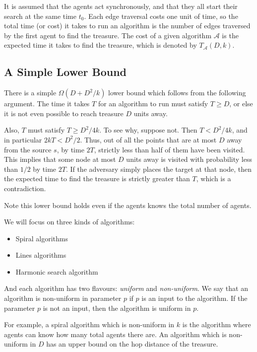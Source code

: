\documentclass[runningheads,a4paper]{llncs}
\begin{document}
It is assumed that the agents act synchronously, and that they all start their search at the same time $t_0$. Each edge traversal costs one unit of time, so the total time (or cost) it takes to run an algorithm is the number of edges traversed by the first agent to find the treasure. The cost of a given algorithm $\mathcal{A}$ is the expected time it takes to find the treasure, which is denoted by $T_\mathcal{A}(D,k)$.

\subsection{A Simple Lower Bound}

There is a simple $\Omega(D+D^2/k)$ lower bound which follows from the following argument. The time it takes $T$ for an algorithm to run must satisfy $T \geq D$, or else it is not even possible to reach treasure $D$ units away. 

Also, $T$ must satisfy $T \geq D^2/4k$. To see why, suppose not. Then $T < D^2/4k$, and in particular $2kT < D^2/2$. Thus, out of all the points that are at most $D$ away from the source $s$, by time $2T$, strictly less than half of them have been visited. This implies that some node at most $D$ units away is visited with probability less than $1/2$ by time $2T$. If the adversary simply places the target at that node, then the expected time to find the treasure is strictly greater than $T$, which is a contradiction.

Note this lower bound holds even if the agents knows the total number of agents. 

We will focus on three kinds of algorithms:
\begin{itemize}
\item Spiral algorithms
\item Lines algorithms
\item Harmonic search algorithm
\end{itemize}

And each algorithm has two flavours: \emph{uniform} and \emph{non-uniform}. We say that an algorithm is non-uniform in parameter $p$ if $p$ is an input to the algorithm. If the parameter $p$ is not an input, then the algorithm is uniform in $p$. 

For example, a spiral algorithm which is non-uniform in $k$ is the algorithm where agents can know how many total agents there are. An algorithm which is non-uniform in $D$ has an upper bound on the hop distance of the treasure. 
\end{document}
